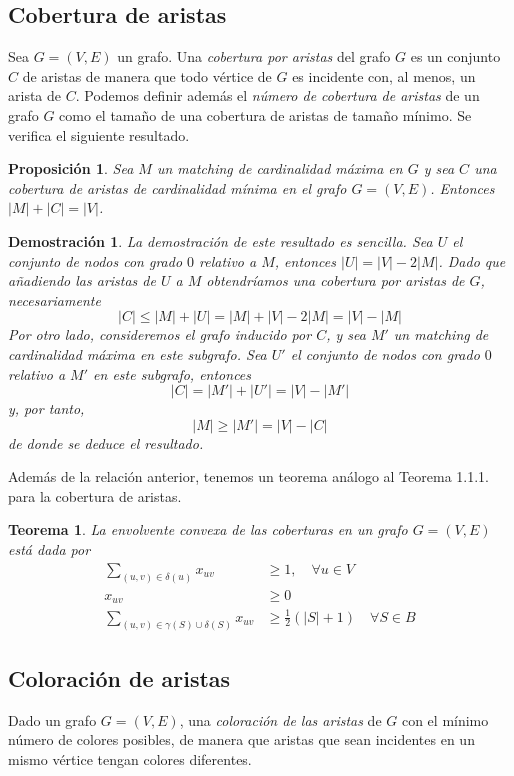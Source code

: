 \documentclass[twoside,a4paper,openright,12pt,tikz]{book}
\newtheorem{prop}{Proposici\'on}[section]
\newtheorem{thm}{Teorema}[section]
\newtheorem*{dem}{Demostración}
\begin{document}
\subsection{Cobertura de aristas}
Sea $G=(V,E)$ un grafo. Una \textit{cobertura por aristas} del grafo $G$ es un conjunto $C$ de aristas de manera que todo vértice de $G$ es incidente con, al menos, un arista de $C$. Podemos definir además el \textit{número de cobertura de aristas} de un grafo $G$ como el tamaño de una cobertura de aristas de tamaño mínimo. Se verifica el siguiente resultado.
\begin{prop}
Sea $M$ un matching de cardinalidad máxima en $G$ y sea $C$ una cobertura de aristas de cardinalidad mínima en el grafo $G=(V,E)$. Entonces $|M|+|C|=|V|$.
\end{prop}
\begin{dem}
La demostración de este resultado es sencilla. Sea $U$ el conjunto de nodos con grado $0$ relativo a $M$, entonces $|U|=|V|-2|M|$. Dado que añadiendo las aristas de $U$ a $M$ obtendríamos una cobertura por aristas de $G$, necesariamente
$$
|C| \leq |M|+|U| = |M| + |V|-2|M| = |V|-|M|
$$
Por otro lado, consideremos el grafo inducido por $C$, y sea $M'$ un matching de cardinalidad máxima en este subgrafo. Sea $U'$ el conjunto de nodos con grado $0$ relativo a $M'$ en este subgrafo, entonces
$$
|C| = |M'| +|U'| = |V|-|M'|
$$
y, por tanto,
$$
|M| \geq |M'| = |V|-|C|
$$
de donde se deduce el resultado.
\end{dem}
Además de la relación anterior, tenemos un teorema análogo al Teorema 1.1.1. para la cobertura de aristas.
\begin{thm}
La envolvente convexa de las coberturas en un grafo $G=(V,E)$ está dada por
\begin{align*}
\sum_{(u,v)\in\delta(u)} x_{uv} &\geq 1, \quad \forall u\in V\\
x_{uv} &\geq 0\\
\sum_{(u,v)\in \gamma(S)\cup\delta(S)} x_{uv}& \geq \frac{1}{2}(|S|+1)\quad \forall S \in B	
\end{align*}
\end{thm}


\subsection{Coloración de aristas}
Dado un grafo $G=(V,E)$, una \textit{coloración de las aristas} de $G$ con el mínimo número de colores posibles, de manera que aristas que sean incidentes en un mismo vértice tengan colores diferentes. 
\end{document}
